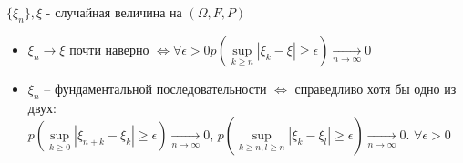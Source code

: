 \begin{theorem}[характеризация сходимости с $p=1$]
$\{\xi_{n} \}, \xi$ - случайная величина на $(\Omega, F, P)$
\begin{itemize}
\item $\xi_{n} \rightarrow \xi$ почти наверно $\Leftrightarrow \forall \epsilon > 0 p(\sup\limits_{k \geqslant n}|\xi_{k}-\xi|\geqslant \epsilon) \xrightarrow[n \rightarrow \infty]{} 0$
\item $\xi_{n}$ -- фундаментальной последовательности $\Leftrightarrow$ справедливо хотя бы одно из двух:\\
$p(\sup\limits_{k \geqslant 0}|\xi_{n+k}-\xi_{k}|\geqslant \epsilon)\xrightarrow[n\rightarrow \infty]{} 0$, $p(\sup\limits_{k \geqslant n, l\geqslant n} |\xi_{k}-\xi_{l}|\geqslant \epsilon) \xrightarrow[n\rightarrow \infty]{} 0$. $\forall \epsilon > 0$
\end{itemize}
\end{theorem}
